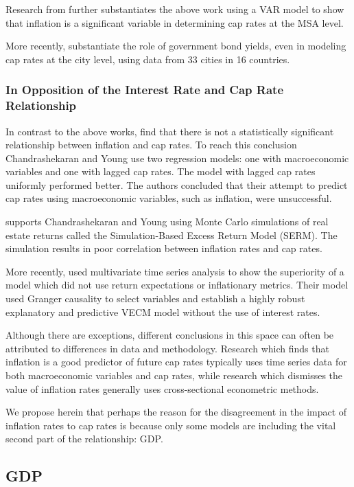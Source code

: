 \documentclass[jrfm,article,accept,oneauthor,pdftex]{Definitions/mdpi}
\begin{document}
Research from \cite{wheaton2001real} further substantiates the above work using a VAR model to show that inflation is a significant variable in determining cap rates at the MSA level. 

More recently,  \cite{DEVANEY2019100469} substantiate the role of government bond yields, even in modeling cap rates at the city level, using data from 33 cities in 16 countries. 

\subsubsection{In Opposition of the Interest Rate and Cap Rate Relationship}
In contrast to the above works, \cite{chandrashekaran2000predictability} find that there is not a statistically significant relationship between inflation and cap rates. To reach this conclusion Chandrashekaran and Young use two regression models: one with macroeconomic variables and one with lagged cap rates. The model with lagged cap rates uniformly performed better. The authors concluded that their attempt to predict cap rates using macroeconomic variables, such as inflation, were unsuccessful. 

\cite{Gimpelevich2011} supports Chandrashekaran and Young using Monte Carlo simulations of real estate returns called the Simulation-Based Excess Return Model (SERM). The simulation results in poor correlation between inflation rates and cap rates.

More recently, \cite{larriva2021determinants} used multivariate time series analysis to show the superiority of a model which did not use return expectations or inflationary metrics. Their model used Granger causality to select variables and establish a highly robust explanatory and predictive VECM model without the use of interest rates.

Although there are exceptions, different conclusions in this space can often be attributed to differences in data and methodology. Research which finds that inflation is a good predictor of future cap rates typically uses time series data for both macroeconomic variables and cap rates, while research which dismisses the value of inflation rates generally uses cross-sectional econometric methods.

We propose herein that perhaps the reason for the disagreement in the impact of inflation rates to cap rates is because only some models are including the vital second part of the relationship: GDP.


\subsection{GDP}
\end{document}
